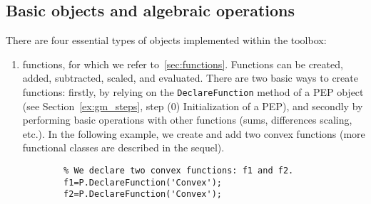 \documentclass[11pt,a4paper]{article}
\begin{document}
	\subsection{Basic objects and algebraic operations}\label{sec:basicobjects}
	There are four essential types of objects implemented within the toolbox:
	\begin{enumerate}
		\item functions, for which we refer to~\ref{sec:functions}. Functions can be created, added, subtracted, scaled, and evaluated. There are two basic ways to create functions: firstly, by relying on the \verb?DeclareFunction? method of a PEP object (see Section~\ref{ex:gm_steps}, step (0) Initialization of a PEP), and secondly by performing basic operations with other functions (sums, differences scaling, etc.). In the following example, we create and add two convex functions (more functional classes are described in the sequel).\\[-1cm]
		\begin{lstlisting}
		% We declare two convex functions: f1 and f2.
		f1=P.DeclareFunction('Convex'); 
		f2=P.DeclareFunction('Convex');
		

\end{lstlisting}
\end{enumerate}
\end{document}
